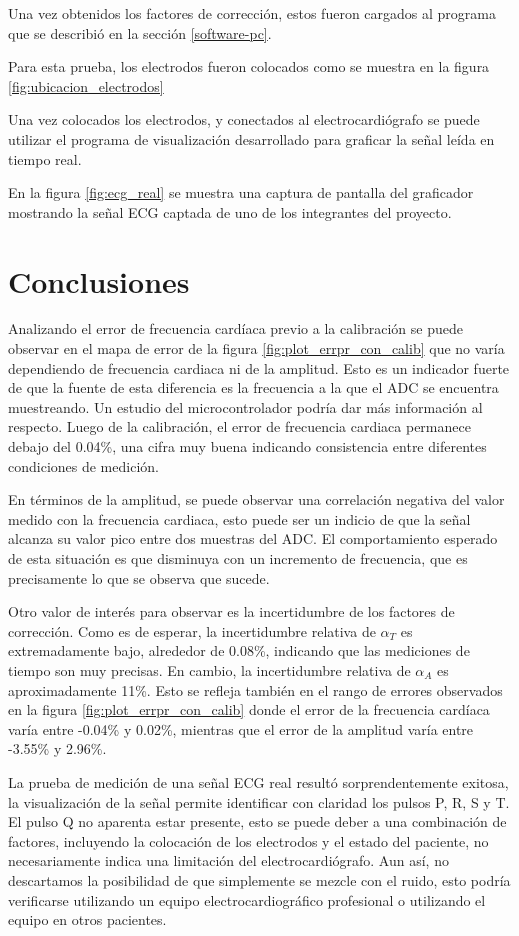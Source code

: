 \documentclass[conference]{IEEEtran}
\begin{document}
Una vez obtenidos los factores de corrección, estos fueron cargados al programa
que se describió en la sección \ref{software-pc}.

Para esta prueba, los electrodos fueron colocados como se muestra en la figura
\ref{fig:ubicacion_electrodos}

Una vez colocados los electrodos, y conectados al electrocardiógrafo se puede
utilizar el programa de visualización desarrollado para graficar la señal leída
en tiempo real.

En la figura \ref{fig:ecg_real} se muestra una captura de pantalla del
graficador mostrando la señal ECG captada de uno de los integrantes del
proyecto.

\section{Conclusiones}

Analizando el error de frecuencia cardíaca previo a la calibración se puede
observar en el mapa de error de la figura \ref{fig:plot_errpr_con_calib} que no
varía dependiendo de frecuencia cardiaca ni de la amplitud. Esto es un indicador
fuerte de que la fuente de esta diferencia es la frecuencia a la que el ADC se
encuentra muestreando. Un estudio del microcontrolador podría dar más
información al respecto. Luego de la calibración, el error de frecuencia
cardiaca permanece debajo del 0.04\%, una cifra muy buena indicando consistencia
entre diferentes condiciones de medición.

En términos de la amplitud, se puede observar una correlación negativa del valor
medido con la frecuencia cardiaca, esto puede ser un indicio de que la señal
alcanza su valor pico entre dos muestras del ADC. El comportamiento esperado de
esta situación es que disminuya con un incremento de frecuencia, que es
precisamente lo que se observa que sucede.

Otro valor de interés para observar es la incertidumbre de los factores de
corrección. Como es de esperar, la incertidumbre relativa de $\alpha_T$ es
extremadamente bajo, alrededor de 0.08\%, indicando que las mediciones de tiempo
son muy precisas. En cambio, la incertidumbre relativa de $\alpha_A$ es
aproximadamente 11\%. Esto se refleja también en el rango de errores observados
en la figura \ref{fig:plot_errpr_con_calib} donde el error de la frecuencia cardíaca varía entre
-0.04\% y 0.02\%, mientras que el error de la amplitud varía entre -3.55\%
y 2.96\%.

La prueba de medición de una señal ECG real resultó sorprendentemente exitosa,
la visualización de la señal permite identificar con claridad los pulsos P, R, S
y T. El pulso Q no aparenta estar presente, esto se puede deber a una
combinación de factores, incluyendo la colocación de los electrodos y el estado
del paciente, no necesariamente indica una limitación del electrocardiógrafo.
Aun así, no descartamos la posibilidad de que simplemente se mezcle con el
ruido, esto podría verificarse utilizando un equipo electrocardiográfico
profesional o utilizando el equipo en otros pacientes.
\end{document}

